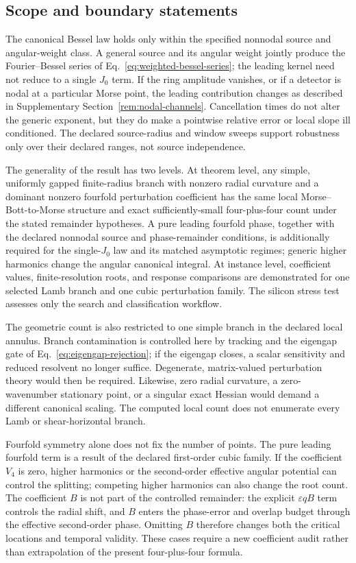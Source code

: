 \subsection{Scope and boundary statements}

The canonical Bessel law holds only within the specified nonnodal source and
angular-weight class.  A general source and its angular weight jointly produce
the Fourier--Bessel series of Eq.~\eqref{eq:weighted-bessel-series}; the leading
kernel need not reduce to a single \(J_0\) term.  If the ring amplitude
vanishes, or if a detector is nodal at a particular Morse point, the leading
contribution changes as described in Supplementary
Section~\ref{rem:nodal-channels}.
Cancellation times do not alter the generic exponent, but they do make a
pointwise relative error or local slope ill conditioned.  The declared
source-radius and window sweeps support robustness only over their declared
ranges, not source independence.

The generality of the result has two levels.  At theorem level, any simple,
uniformly gapped finite-radius branch with nonzero radial curvature and a
dominant nonzero fourfold perturbation coefficient has the same local
Morse--Bott-to-Morse structure and exact sufficiently-small four-plus-four
count under the stated remainder hypotheses.  A pure leading fourfold phase,
together with the declared nonnodal source and phase-remainder conditions, is
additionally required for the single-\(J_0\) law and its matched asymptotic
regimes; generic higher harmonics change the angular canonical integral.  At
instance level, coefficient values,
finite-resolution roots, and response comparisons are demonstrated for one
selected Lamb branch and one cubic perturbation family.  The silicon stress
test assesses only the search and classification workflow.

The geometric count is also restricted to one simple branch in the declared
local annulus.  Branch contamination is controlled here by tracking and the
eigengap gate of Eq.~\eqref{eq:eigengap-rejection}; if the eigengap closes, a
scalar sensitivity and reduced resolvent no longer suffice.  Degenerate,
matrix-valued perturbation theory would then be required.  Likewise, zero
radial curvature, a zero-wavenumber stationary point, or a singular exact
Hessian would demand a different canonical scaling.  The computed local count
does not enumerate every Lamb or shear-horizontal branch.

Fourfold symmetry alone does not fix the number of points.  The pure leading
fourfold term is a result of the declared first-order cubic family.  If the
coefficient \(V_4\) is zero, higher harmonics or the second-order effective
angular potential can control the splitting; competing higher harmonics can
also change the root count.  The coefficient \(B\) is not part of the
controlled remainder: the explicit \(\varepsilon qB\) term controls the radial
shift, and \(B\) enters the phase-error and overlap budget through the effective
second-order phase.  Omitting \(B\) therefore changes both the critical
locations and temporal validity.  These cases require a new
coefficient audit rather than extrapolation of the present four-plus-four
formula.

